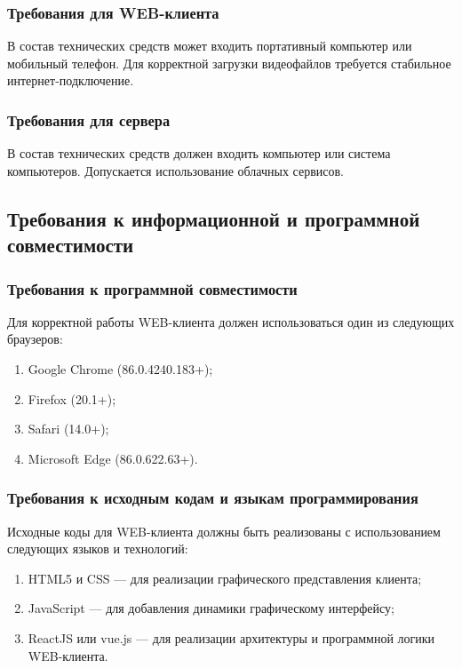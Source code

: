 \subsubsection{Требования для WEB-клиента}
В состав технических средств может входить портативный компьютер или мобильный телефон.
Для корректной загрузки видеофайлов требуется стабильное интернет-подключение.

\subsubsection{Требования для сервера}
В состав технических средств должен входить компьютер или система компьютеров.
Допускается использование облачных сервисов.

\subsection{Требования к информационной и программной совместимости}

\subsubsection{Требования к программной совместимости}
Для корректной работы WEB-клиента должен использоваться один из следующих браузеров:
\begin{enumerate}[noitemsep]
    \item Google Chrome (86.0.4240.183+);
    \item Firefox (20.1+);
    \item Safari (14.0+);
    \item Microsoft Edge (86.0.622.63+).
\end{enumerate}

\subsubsection{Требования к исходным кодам и языкам программирования}

Исходные коды для WEB-клиента должны быть реализованы с использованием следующих языков и технологий:
\begin{enumerate}[noitemsep]
    \item HTML5 и CSS — для реализации графического представления клиента;
    \item JavaScript — для добавления динамики графическому интерфейсу;
    \item ReactJS или vue.js — для реализации архитектуры и программной логики WEB-клиента.
\end{enumerate}

